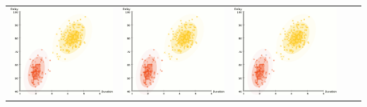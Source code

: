 \documentclass{beamer}
\begin{document}
\begin{frame}
{\begin{tabular}{ccccc}
\includegraphics[scale=0.2]{em/frame_12_delay-0}&
\includegraphics[scale=0.2]{em/frame_13_delay-0}&
\includegraphics[scale=0.2]{em/frame_14_delay-0}\\
\end{tabular}
}
\end{frame}
\end{document}
